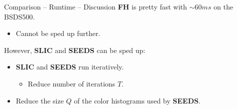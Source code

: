 \documentclass[handout]{beamer}
\begin{document}
	\begin{frame}{Comparison -- Runtime -- Discussion}
		\textbf{FH} is pretty fast with $\sim 60ms$ on the BSDS500.
		\vskip 0.25cm
		\begin{itemize}[label=--]
			\item Cannot be sped up further.
		\end{itemize}
		\vskip 0.5cm
		
		However, \textbf{SLIC} and \textbf{SEEDS} can be sped up:
		\vskip 0.25cm
		\begin{itemize}[label=--]
			\item \textbf{SLIC} and \textbf{SEEDS} run iteratively.
			\vskip 0.25cm
			\begin{itemize}[label=$\rightarrow$]
				\item Reduce number of iterations $T$.
			\end{itemize}
			
			\item Reduce the size $Q$ of the color histograms used by \textbf{SEEDS}.
		\end{itemize}
	\end{frame}
	
\end{document}
